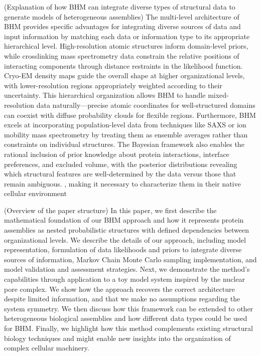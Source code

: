 \documentclass[pdflatex,sn-mathphys-num]{sn-jnl}%
\theoremstyle{thmstyleone}%
\theoremstyle{thmstyletwo}%
\theoremstyle{thmstylethree}%
\begin{document}
{(Explanation of how BHM can integrate diverse types of structural data to generate models of heterogeneous assemblies) The multi-level architecture of BHM provides specific advantages for integrating diverse sources of data and input information by matching each data or information type to its appropriate hierarchical level. High-resolution atomic structures inform domain-level priors, while crosslinking mass spectrometry data constrain the relative positions of interacting components through distance restraints in the likelihood function. Cryo-EM density maps guide the overall shape at higher organizational levels, with lower-resolution regions appropriately weighted according to their uncertainty. This hierarchical organization allows BHM to handle mixed-resolution data naturally—precise atomic coordinates for well-structured domains can coexist with diffuse probability clouds for flexible regions. Furthermore, BHM excels at incorporating population-level data from techniques like SAXS or ion mobility mass spectrometry by treating them as ensemble averages rather than constraints on individual structures. The Bayesian framework also enables the rational inclusion of prior knowledge about protein interactions, interface preferences, and excluded volume, with the posterior distributions revealing which structural features are well-determined by the data versus those that remain ambiguous. 
,  making it necessary to characterize them in their native cellular environment

(Overview of the paper structure) In this paper, we first describe the mathematical foundation of our BHM approach and how it represents protein assemblies as nested probabilistic structures with defined dependencies between organizational levels. We describe the details of our approach, including model representation, formulation of data likelihoods and priors to integrate diverse sources of information, Markov Chain Monte Carlo sampling implementation, and model validation and assessment strategies. Next, we demonstrate the method's capabilities through application to a toy model system inspired by the nuclear pore complex. We show how the approach recovers the correct architecture despite limited information, and that we make no assumptions regarding the system symmetry. We then discuss how this framework can be extended to other heterogeneous biological assemblies and how different data types could be used for BHM. Finally, we highlight how this method complements existing structural biology techniques and might enable new insights into the organization of complex cellular machinery.

}
\end{document}
